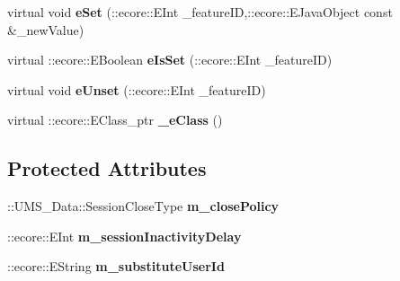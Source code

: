 \begin{DoxyCompactItemize}
\item 
\hypertarget{classUMS__Data_1_1ConnectOptions_a6d70fd8e50af83b2142859d05957d7f2}{
virtual void {\bfseries eSet} (::ecore::EInt \_\-featureID,::ecore::EJavaObject const \&\_\-newValue)}
\label{classUMS__Data_1_1ConnectOptions_a6d70fd8e50af83b2142859d05957d7f2}

\item 
\hypertarget{classUMS__Data_1_1ConnectOptions_a28640c4b65e3acee2d21530b2fb03667}{
virtual ::ecore::EBoolean {\bfseries eIsSet} (::ecore::EInt \_\-featureID)}
\label{classUMS__Data_1_1ConnectOptions_a28640c4b65e3acee2d21530b2fb03667}

\item 
\hypertarget{classUMS__Data_1_1ConnectOptions_a4ead7d544e966c8f2a0af1c62739043a}{
virtual void {\bfseries eUnset} (::ecore::EInt \_\-featureID)}
\label{classUMS__Data_1_1ConnectOptions_a4ead7d544e966c8f2a0af1c62739043a}

\item 
\hypertarget{classUMS__Data_1_1ConnectOptions_a441200525ce63fdf11612756d64f040a}{
virtual ::ecore::EClass\_\-ptr {\bfseries \_\-eClass} ()}
\label{classUMS__Data_1_1ConnectOptions_a441200525ce63fdf11612756d64f040a}

\end{DoxyCompactItemize}
\subsection*{Protected Attributes}
\begin{DoxyCompactItemize}
\item 
\hypertarget{classUMS__Data_1_1ConnectOptions_afb2e0904a3674618a54abf5f1217b4e1}{
::UMS\_\-Data::SessionCloseType {\bfseries m\_\-closePolicy}}
\label{classUMS__Data_1_1ConnectOptions_afb2e0904a3674618a54abf5f1217b4e1}

\item 
\hypertarget{classUMS__Data_1_1ConnectOptions_a0c208fd07c10bbf85ad055519364bba3}{
::ecore::EInt {\bfseries m\_\-sessionInactivityDelay}}
\label{classUMS__Data_1_1ConnectOptions_a0c208fd07c10bbf85ad055519364bba3}

\item 
\hypertarget{classUMS__Data_1_1ConnectOptions_ac4f8721a90bfa71428c8c8707ba7d801}{
::ecore::EString {\bfseries m\_\-substituteUserId}}
\label{classUMS__Data_1_1ConnectOptions_ac4f8721a90bfa71428c8c8707ba7d801}

\end{DoxyCompactItemize}


